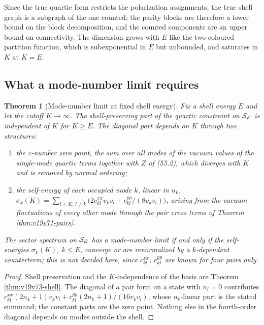 \documentclass[11pt]{article}
\newtheorem{theorem}{Theorem}[section]
\theoremstyle{remark}
\begin{document}
Since the true quartic form restricts the polarization assignments,
the true shell graph is a subgraph of the one counted; the parity
blocks are therefore a lower bound on the block decomposition, and the
counted components are an upper bound on connectivity.  The dimension
grows with \(E\) like the two-coloured partition function, which is
subexponential in \(E\) but unbounded, and saturates in \(K\) at
\(K=E\).

\subsection{What a mode-number limit requires}

\begin{theorem}[Mode-number limit at fixed shell energy]
\label{thm:v19v73-limit}
Fix a shell energy \(E\) and let the cutoff \(K\to\infty\).  The
shell-preserving part of the quartic constraint on \({\cal S}_E\) is
independent of \(K\) for \(K\geq E\).  The diagonal part depends on
\(K\) through two structures:
\begin{enumerate}
\item the c-number zero point, the sum over all modes of the vacuum
      values of the single-mode quartic terms together with
      \(Z\) of (55.2), which diverges with \(K\) and is removed by
      normal ordering;
\item the self-energy of each occupied mode \(k\), linear in \(n_k\),
      \(\sigma_k(K)=\sum_{l\leq K,\,l\neq k}\bigl(2c^{xx}_{kl}v_kv_l+c^{pp}_{kl}/(8v_kv_l)\bigr)\),
      arising from the vacuum fluctuations of every other mode through
      the pair cross terms of Theorem \ref{thm:v19v71-pairs}.
\end{enumerate}
The sector spectrum on \({\cal S}_E\) has a mode-number limit if and
only if the self-energies \(\sigma_k(K)\), \(k\leq E\), converge or are
renormalized by a \(k\)-dependent counterterm; this is not decided
here, since \(c^{xx}_{kl}\), \(c^{pp}_{kl}\) are known for four pairs
only.
\end{theorem}

\begin{proof}
Shell preservation and the \(K\)-independence of the basis are Theorem
\ref{thm:v19v73-shell}.  The diagonal of a pair form on a state with
\(n_l=0\) contributes \(c^{xx}_{kl}(2n_k+1)v_kv_l+c^{pp}_{kl}(2n_k+1)/(16v_kv_l)\),
whose \(n_k\)-linear part is the stated summand; the constant parts
are the zero point.  Nothing else in the fourth-order diagonal depends
on modes outside the shell.
\end{proof}
\end{document}
